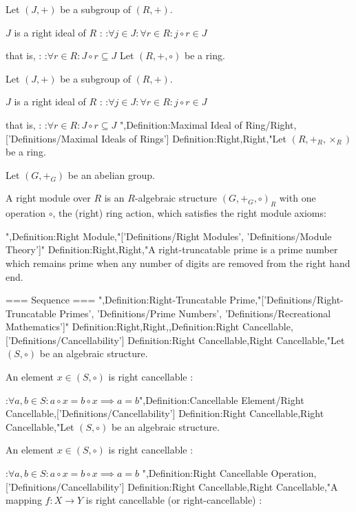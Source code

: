 Let $\left( J, + \right)$ be a subgroup of $\left( R, + \right)$.


$J$ is a right ideal of $R$ :
:$\forall j \in J: \forall r \in R: j \circ r \in J$

that is, :
:$\forall r \in R: J \circ r \subseteq J$
Let $\left( R, +, \circ \right)$ be a ring.

Let $\left( J, + \right)$ be a subgroup of $\left( R, + \right)$.


$J$ is a right ideal of $R$ :
:$\forall j \in J: \forall r \in R: j \circ r \in J$

that is, :
:$\forall r \in R: J \circ r \subseteq J$
",Definition:Maximal Ideal of Ring/Right,['Definitions/Maximal Ideals of Rings']
Definition:Right,Right,"Let $\left( R, +_R, \times_R \right)$ be a ring.

Let $\left( G, +_G \right)$ be an abelian group.


A right module over $R$ is an $R$-algebraic structure $\left( G, +_G, \circ \right)_R$ with one operation $\circ$, the (right) ring action, which satisfies the right module axioms:

",Definition:Right Module,"['Definitions/Right Modules', 'Definitions/Module Theory']"
Definition:Right,Right,"A right-truncatable prime is a prime number which remains prime when any number of digits are removed from the right hand end.


=== Sequence ===
",Definition:Right-Truncatable Prime,"['Definitions/Right-Truncatable Primes', 'Definitions/Prime Numbers', 'Definitions/Recreational Mathematics']"
Definition:Right,Right,,Definition:Right Cancellable,['Definitions/Cancellability']
Definition:Right Cancellable,Right Cancellable,"Let $\left( S, \circ \right)$ be an algebraic structure.


An element $x \in \left( S, \circ \right)$ is right cancellable :

:$\forall a, b \in S: a \circ x = b \circ x \implies a = b$",Definition:Cancellable Element/Right Cancellable,['Definitions/Cancellability']
Definition:Right Cancellable,Right Cancellable,"Let $\left( S, \circ \right)$ be an algebraic structure.


An element $x \in \left( S, \circ \right)$ is right cancellable :

:$\forall a, b \in S: a \circ x = b \circ x \implies a = b$
",Definition:Right Cancellable Operation,['Definitions/Cancellability']
Definition:Right Cancellable,Right Cancellable,"A mapping $f: X \to Y$ is right cancellable (or right-cancellable) :

